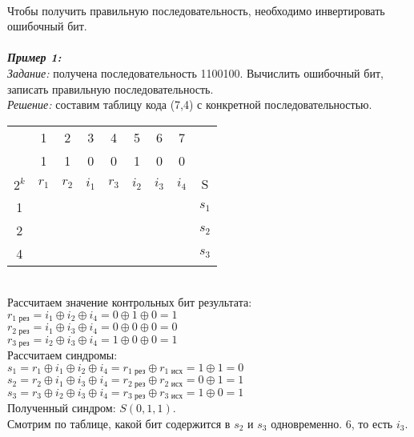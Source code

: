 \\Чтобы получить правильную последовательность, необходимо инвертировать ошибочный бит.
\\
\\\emph{\textbf{Пример 1:}}
\\\emph{Задание:} получена последовательность 1100100. Вычислить ошибочный бит, записать правильную последовательность.
\\\emph{Решение:} составим таблицу кода (7,4) с конкретной последовательностью.
\begin{table}[h]
\begin{tabular}{|c|c|c|c|c|c|c|c|c|}
\hline
& 1 & 2 & 3 & 4 & 5 & 6 & 7 & \\
\rowcolor{Gray1}
\hline
& 1 & 1 & 0 & 0 & 1 & 0 & 0 & \\
\hline
$2^k$ & $r_{1}$ & $r_{2}$ & $i_{1}$ & $r_{3}$ & $i_{2}$ & $i_{3}$ & $i_{4}$ & S\\
\hline
1 & \cellcolor{Gray1}{X} & & \cellcolor{Gray1}{X} & & \cellcolor{Gray1}{X} & & \cellcolor{Gray1}{X} & $s_{1}$\\
\hline
2 & & \cellcolor{Gray2}{X} & \cellcolor{Gray2}{X} & & & \cellcolor{Gray2}{X} & \cellcolor{Gray2}{X} & $s_{2}$ \\
\hline
4 & & & & \cellcolor{Gray3}{X} & \cellcolor{Gray3}{X} & \cellcolor{Gray3}{X} & \cellcolor{Gray3}{X} & $s_{3}$ \\
\hline
\end{tabular}
\end{table}
\\Рассчитаем значение контрольных бит результата:
\\$r_{1\mbox{ рез}} = i_1 \oplus i_2 \oplus i_4 = 0 \oplus 1 \oplus 0 = 1$
\\$r_{2\mbox{ рез}} = i_1 \oplus i_3 \oplus i_4 = 0 \oplus 0 \oplus 0 = 0$
\\$r_{3\mbox{ рез}} = i_2 \oplus i_3 \oplus i_4 = 1 \oplus 0 \oplus 0 = 1$
\\Рассчитаем синдромы:
\\$s_1 = r_1 \oplus i_1 \oplus i_2 \oplus i_4 = r_{1\mbox{ рез}} \oplus r_{1\mbox{ исх}} = 1 \oplus 1 = 0$
\\$s_2 = r_2 \oplus i_1 \oplus i_3 \oplus i_4 = r_{2\mbox{ рез}} \oplus r_{2\mbox{ исх}} = 0 \oplus 1 = 1$
\\$s_3 = r_3 \oplus i_2 \oplus i_3 \oplus i_4 = r_{3\mbox{ рез}} \oplus r_{3\mbox{ исх}} = 1 \oplus 0 = 1$
\\Полученный синдром: $S(0,1,1)$.
\\Смотрим по таблице, какой бит содержится в $s_2$ и $s_3$ одновременно. 6, то есть $i_3$.
